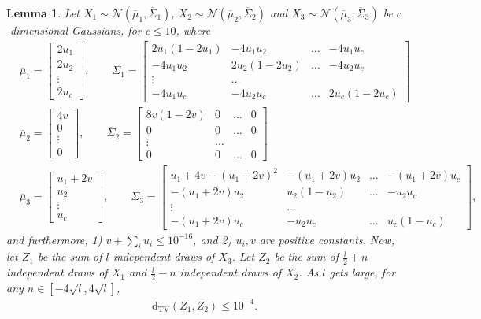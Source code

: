 \documentclass[10pt]{article} %
\theoremstyle{plain}
\newtheorem{lemma}[theorem]{Lemma}
\newcommand{\dtv}{\mathrm{d_{TV}}}
\begin{document}
\begin{lemma}
	\label{lem:different-t-gaussians-close}
	Let $X_1 \sim \mathcal{N}(\overline{\mu}_1, \overline{\Sigma}_1)$, $X_2 \sim \mathcal{N}(\overline{\mu}_2, \overline{\Sigma}_2)$ and $X_3 \sim \mathcal{N}(\overline{\mu}_3, \overline{\Sigma}_3)$ be $c$-dimensional Gaussians, for $c \le 10$, where
	\begin{align*}
		&\overline{\mu}_1 = \begin{bmatrix}
			2u_1 \\
			2u_2 \\
			\vdots \\
			2u_c
		\end{bmatrix},
		\qquad \overline{\Sigma}_1 = \begin{bmatrix}
			2u_1(1-2u_1) & -4u_1u_2 & \dots &-4u_1u_c \\
			-4u_1u_2 & 2u_2(1-2u_2) & \dots &-4u_2u_c \\
			\vdots & \dots \\
			-4u_1u_c & -4u_2u_c & \dots & 2u_c(1-2u_c)
		\end{bmatrix}
		\\
		&\overline{\mu}_2 = \begin{bmatrix}
			4v \\
			0 \\
			\vdots \\
			0
		\end{bmatrix},
		\qquad \overline{\Sigma}_2 = \begin{bmatrix}
			8v(1-2v) & 0 & \dots & 0 \\
			0 & 0 & \dots & 0 \\
			\vdots & \dots\\
			0 & 0 &\dots & 0
		\end{bmatrix}\\
		&\overline{\mu}_3 = \begin{bmatrix}
			u_1 + 2v \\
			u_2 \\
			\vdots \\
			u_c
		\end{bmatrix},
		\qquad \overline{\Sigma}_3 = \begin{bmatrix}
			u_1 + 4v - (u_1 + 2v)^2 & -(u_1+2v)u_2 & \dots &-(u_1+2v)u_c \\
			-(u_1+2v)u_2 & u_2(1-u_2) & \dots &-u_2u_c \\
			\vdots & \dots \\
			-(u_1+2v)u_c & -u_2u_c & \dots & u_c(1-u_c)
		\end{bmatrix},
	\end{align*}
	and furthermore, 1) $v + \sum_i u_i \le 10^{-16}$, and 2) $u_i, v$ are positive constants. Now, let $Z_1$ be the sum of $l$ independent draws of $X_3$. Let $Z_2$ be the sum of $\frac{l}{2}+n$ independent draws of $X_1$ and $\frac{l}{2}-n$ independent draws of $X_2$. As $l$ gets large, for any $n \in [-4\sqrt{l}, 4\sqrt{l}]$,
	\begin{align*}
		\dtv(Z_1, Z_2) \le 10^{-4}.
	\end{align*}
\end{lemma}
\end{document}
